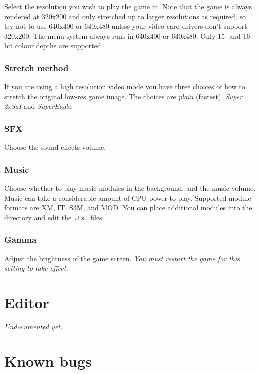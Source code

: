 \documentclass[a4paper]{article}
\begin{document}
Select the resolution you wish to play the game in.  Note that the
game is always rendered at 320x200 and only stretched up to larger
resolutions as required, so try not to use 640x400 or 640x480 unless
your video card drivers don't support 320x200.  The menu system always
runs in 640x400 or 640x480.  Only 15- and 16-bit colour depths are
supported.

\subsubsection*{Stretch method}

If you are using a high resolution video mode you have three choices
of how to stretch the original low-res game image.  The choices are
\emph{plain} (fastest), \emph{Super 2xSaI} and \emph{SuperEagle}.

\subsubsection*{SFX}

Choose the sound effects volume.

\subsubsection*{Music}

Choose whether to play music modules in the background, and the music
volume.  Music can take a considerable amount of CPU power to play.
Supported module formats are XM, IT, S3M, and MOD.  You can place
additional modules into the  directory and edit the
\texttt{.txt} files.

\subsubsection*{Gamma}

Adjust the brightness of the game screen.  \emph{You must restart the
game for this setting to take effect.}



\section{Editor}

\emph{Undocumented yet.}


\section{Known bugs}
\end{document}
